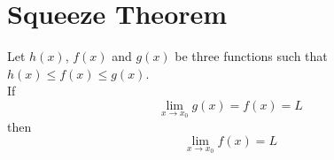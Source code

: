 \documentclass[a4paper]{article}
\begin{document}
\section{Squeeze Theorem}

Let \(h(x)\), \(f(x)\) and \(g(x)\) be three functions such that
\(h(x) \leq f(x) \leq g(x)\). \\
If
\[
    \lim_{x \to x_0} g(x) = f(x) = L
\]
then
\[
    \lim_{x \to x_0} f(x) = L
\]


\end{document}
